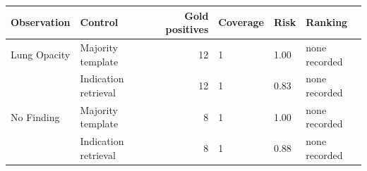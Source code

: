 \begingroup
\setlength{\tabcolsep}{5pt}
\begin{tabular}{llrlll}
\toprule
Observation & Control & Gold positives & Coverage & Risk & Ranking \\
\midrule
Lung Opacity & Majority template & 12 & 1 & 1.00 & none recorded \\
 & Indication retrieval & 12 & 1 & 0.83 & none recorded \\
No Finding & Majority template & 8 & 1 & 1.00 & none recorded \\
 & Indication retrieval & 8 & 1 & 0.88 & none recorded \\
\bottomrule
\end{tabular}
\endgroup
